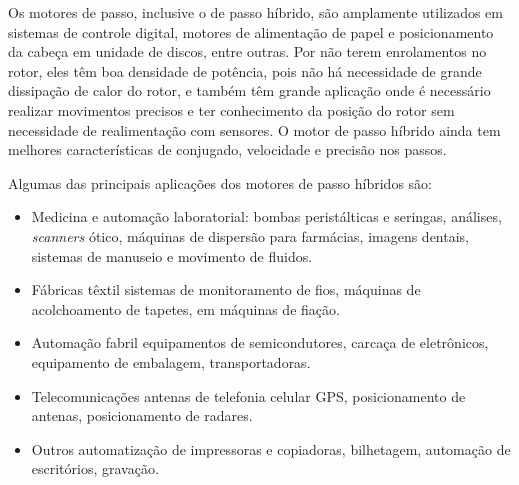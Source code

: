 Os motores de passo, inclusive o de passo híbrido, são amplamente utilizados em sistemas de controle digital, motores de alimentação de papel e posicionamento da cabeça em unidade de discos, entre outras. Por não terem enrolamentos no rotor, eles têm boa densidade de potência, pois não há necessidade de grande dissipação de calor do rotor, e também têm grande aplicação onde é necessário realizar movimentos precisos e ter conhecimento da posição do rotor sem necessidade de realimentação com sensores. O motor de passo híbrido ainda tem melhores características de conjugado, velocidade e precisão nos passos. \cite{Fitz}

Algumas das principais aplicações dos motores de passo híbridos são: \cite{aplciacoes}

\begin{itemize}
	\item Medicina e automação laboratorial: 
	\subitem bombas peristálticas e seringas,
	\subitem análises,
	\subitem \textit{scanners} ótico,
	\subitem máquinas de dispersão para farmácias,
	\subitem imagens dentais,
	\subitem sistemas de manuseio e movimento de fluidos.
	\item Fábricas têxtil
	\subitem sistemas de monitoramento de fios,
	\subitem máquinas de acolchoamento de tapetes,
	\subitem em máquinas de fiação.
	\item Automação fabril
	\subitem equipamentos de semicondutores,
	\subitem carcaça de eletrônicos,
	\subitem equipamento de embalagem,
	\subitem transportadoras.
	\item Telecomunicações
	\subitem antenas de telefonia celular
	\subitem GPS,
	\subitem posicionamento de antenas,
	\subitem posicionamento de radares.
	\item Outros
	\subitem automatização de impressoras e copiadoras,
	\subitem bilhetagem,
	\subitem automação de escritórios,
	\subitem gravação.
\end{itemize}